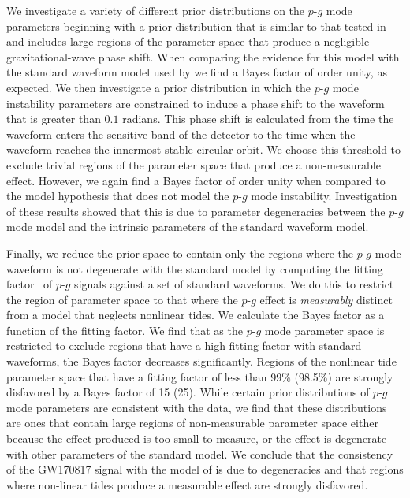 We investigate a variety of different prior distributions on the $p$-$g$ mode parameters beginning with a prior distribution that is similar to that tested in~\cite{abbott2019constraining} and includes large regions of the parameter space that produce a negligible gravitational-wave phase shift. When comparing the evidence for this model with the standard waveform model used by \cite{de2018tidal} we find a Bayes factor of order unity, as expected. We then investigate a prior distribution in which the $p$-$g$ mode instability parameters are constrained to induce a phase shift to the waveform that is greater than $0.1$ radians. This phase shift is calculated from the time the waveform enters the sensitive band of the detector to the time when the waveform reaches the innermost stable circular orbit. We choose this threshold to exclude trivial regions of the parameter space that produce a non-measurable effect. However, we again find a Bayes factor of order unity when compared to the model hypothesis that does not model the $p$-$g$ mode instability. Investigation of these results showed that this is due to parameter degeneracies between the $p$-$g$ mode model and the intrinsic parameters of the standard waveform model.

Finally, we reduce the prior space to contain only the regions where the $p$-$g$ mode waveform is not degenerate with the standard model by computing the fitting factor~\citep{Apostolatos:1995pj} of $p$-$g$ signals against a set of standard waveforms. We do this to restrict the region of parameter space to that where the $p$-$g$ effect is \emph{measurably} distinct from a model that neglects nonlinear tides. We calculate the Bayes factor as a function of the fitting factor. We find that as the $p$-$g$ mode parameter space is restricted to exclude regions that have a high fitting factor with standard waveforms, the Bayes factor decreases significantly. Regions of the nonlinear tide parameter space that have a fitting factor of less than 99\% (98.5\%) are strongly disfavored by a Bayes factor of 15 (25).  While certain prior distributions of $p$-$g$ mode parameters are consistent with the data, we find that these distributions are ones that contain large regions of non-measurable parameter space either because the effect produced is too small to measure, or the effect is degenerate with other parameters of the standard model. We conclude that the consistency of the GW170817 signal with the model of \cite{Essick:2016tkn} is due to degeneracies and that regions where non-linear tides produce a measurable effect are strongly disfavored.

